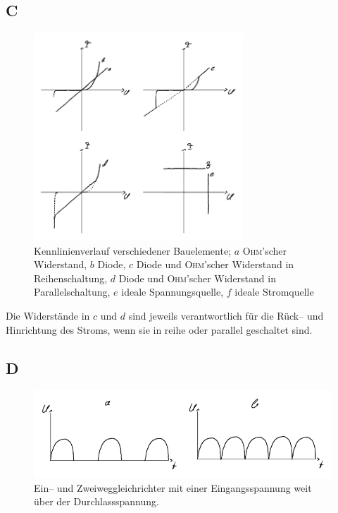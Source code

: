 \documentclass[a4paper,10pt]{article}
\numberwithin{equation}{section}
\begin{document}
\subsection{C}
\begin{figure}[h]
        \centering
        \includegraphics[width=0.7\textwidth]{C_crop.pdf}
        \caption[Kennlinienverlauf verschiedener Bauelemente]{Kennlinienverlauf verschiedener Bauelemente; $a$ \textsc{Ohm}'scher Widerstand, $b$ Diode, $c$ Diode und \textsc{Ohm}'scher Widerstand in Reihenschaltung, $d$ Diode und \textsc{Ohm}'scher Widerstand in Parallelschaltung, $e$ ideale Spannungsquelle, $f$ ideale Stromquelle}
\end{figure}
\noindent Die Widerstände in $c$ und $d$ sind jeweils verantwortlich für die Rück-- und Hinrichtung des Stroms, wenn sie in reihe oder parallel geschaltet sind.

\newpage
\subsection{D}
\begin{figure}[h]
        \centering
        \includegraphics[width=\textwidth]{D_crop.pdf}
        \caption[Ein-- und Zweiweggleichrichter]{Ein-- und Zweiweggleichrichter mit einer Eingangsspannung weit über der Durchlassspannung.}
\end{figure}
\end{document}
